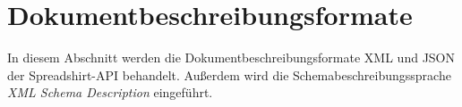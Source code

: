\section{Dokumentbeschreibungsformate}
\label{sec:document_description_formats}

In diesem Abschnitt werden die Dokumentbeschreibungsformate \gls{XML} und \gls{JSON} der Spreadshirt-\gls{API} behandelt. Außerdem wird die Schemabeschreibungssprache \emph{\textsc{XML} Schema Description} eingeführt.






